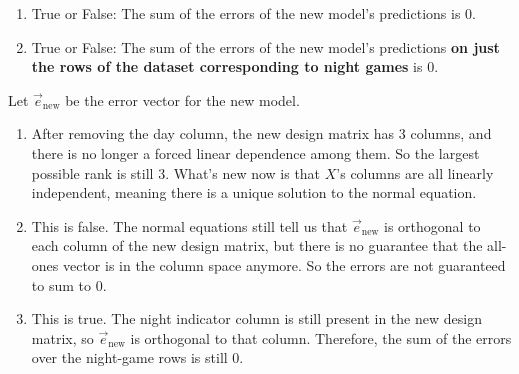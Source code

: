 \documentclass[11pt]{article}
\begin{document}
\begin{prob}[(20 pts)]
\begin{subprob}
\begin{enumerate}[label=(\roman*)]
    \item True or False: The sum of the errors of the new model's predictions is 0.
    
     

    \item True or False: The sum of the errors of the new model's predictions \textbf{on just the rows of the dataset corresponding to night games} is 0.
    
     

\end{enumerate}
\begin{solution}
Let $\vec e_{\text{new}}$ be the error vector for the new model.

\begin{enumerate}[label=(\roman*)]
    \item After removing the day column, the new design matrix has 3 columns, and there is no longer a forced linear dependence among them. So the largest possible rank is still 3. What's new now is that $X$'s columns are all linearly independent, meaning there is a unique solution to the normal equation.

    \item This is false. The normal equations still tell us that $\vec e_{\text{new}}$ is orthogonal to each column of the new design matrix, but there is no guarantee that the all-ones vector is in the column space anymore. So the errors are not guaranteed to sum to 0.

    \item This is true. The night indicator column is still present in the new design matrix, so $\vec e_{\text{new}}$ is orthogonal to that column. Therefore, the sum of the errors over the night-game rows is still 0.
\end{enumerate}
\end{solution}
\end{subprob}

\end{prob}

\newpage

\end{document}
